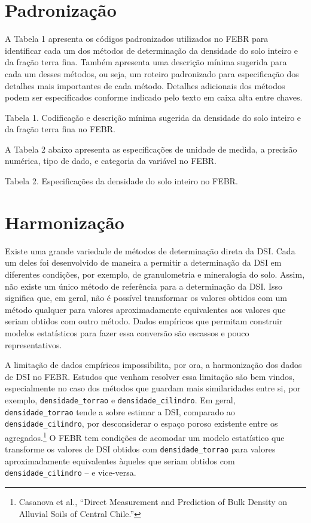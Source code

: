 \documentclass[
  a4paper,
  dvipsnames]{tufte-book}
\begin{document}
\hypertarget{padronizauxe7uxe3o-1}{%
\section{Padronização}\label{padronizauxe7uxe3o-1}}

A Tabela 1 apresenta os códigos padronizados utilizados no FEBR para identificar cada um dos métodos de determinação da densidade do solo inteiro e da fração terra fina. Também apresenta uma descrição mínima sugerida para cada um desses métodos, ou seja, um roteiro padronizado para especificação dos detalhes mais importantes de cada método. Detalhes adicionais dos métodos podem ser especificados conforme indicado pelo texto em caixa alta entre chaves.

Tabela 1. Codificação e descrição mínima sugerida da densidade do solo inteiro e da fração terra fina no FEBR.

A Tabela 2 abaixo apresenta as especificações de unidade de medida, a precisão numérica, tipo de dado, e categoria da variável no FEBR.

Tabela 2. Especificações da densidade do solo inteiro no FEBR.

\hypertarget{harmonizauxe7uxe3o}{%
\section{Harmonização}\label{harmonizauxe7uxe3o}}

Existe uma grande variedade de métodos de determinação direta da DSI. Cada um deles foi desenvolvido de maneira a permitir a determinação da DSI em diferentes condições, por exemplo, de granulometria e mineralogia do solo. Assim, não existe um único método de referência para a determinação da DSI. Isso significa que, em geral, não é possível transformar os valores obtidos com um método qualquer para valores aproximadamente equivalentes aos valores que seriam obtidos com outro método. Dados empíricos que permitam construir modelos estatísticos para fazer essa conversão são escassos e pouco representativos.

A limitação de dados empíricos impossibilita, por ora, a harmonização dos dados de DSI no FEBR. Estudos que venham resolver essa limitação são bem vindos, especialmente no caso dos métodos que guardam mais similaridades entre si, por exemplo, \texttt{densidade\_torrao} e \texttt{densidade\_cilindro}. Em geral, \texttt{densidade\_torrao} tende a sobre estimar a DSI, comparado ao \texttt{densidade\_cilindro}, por desconsiderar o espaço poroso existente entre os agregados.\footnote{Casanova et al., ``Direct Measurement and Prediction of Bulk Density on Alluvial Soils of Central Chile.''} O FEBR tem condições de acomodar um modelo estatístico que transforme os valores de DSI obtidos com \texttt{densidade\_torrao} para valores aproximadamente equivalentes àqueles que seriam obtidos com \texttt{densidade\_cilindro} -- e vice-versa.
\end{document}
